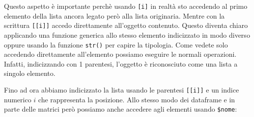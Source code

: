 \documentclass[
]{book}
\newenvironment{Shaded}{\begin{snugshade}}{\end{snugshade}}
\newcommand{\CommentTok}[1]{\textcolor[rgb]{0.56,0.35,0.01}{\textit{#1}}}
\newcommand{\DecValTok}[1]{\textcolor[rgb]{0.00,0.00,0.81}{#1}}
\newcommand{\KeywordTok}[1]{\textcolor[rgb]{0.13,0.29,0.53}{\textbf{#1}}}
\newcommand{\NormalTok}[1]{#1}
\newcommand{\OperatorTok}[1]{\textcolor[rgb]{0.81,0.36,0.00}{\textbf{#1}}}
\begin{document}
Questo aspetto è importante perchè usando \texttt{{[}i{]}} in realtà sto accedendo al primo elemento della lista ancora legato però alla lista originaria. Mentre con la scrittura \texttt{{[}{[}i{]}{]}} accedo direttamente all'oggetto contenuto. Questo diventa chiaro applicando una funzione generica allo stesso elemento indicizzato in modo diverso oppure usando la funzione \texttt{str()} per capire la tipologia. Come vedete solo accedendo direttamente all'elemento possiamo eseguire le normali operazioni. Infatti, indicizzando con 1 parentesi, l'oggetto è riconosciuto come una lista a singolo elemento.

\begin{Shaded}
\end{Shaded}

Fino ad ora abbiamo indicizzato la lista usando le parentesi \texttt{{[}{[}i{]}{]}} e un indice numerico \(i\) che rappresenta la posizione. Allo stesso modo dei dataframe e in parte delle matrici però possiamo anche accedere agli elementi usando \texttt{\$nome}:

\begin{Shaded}
\end{Shaded}
\end{document}
